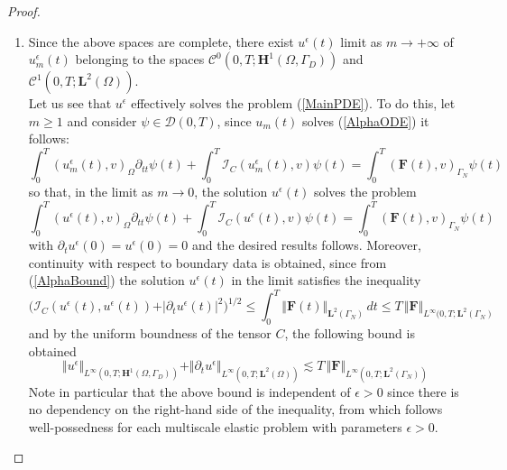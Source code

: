 \begin{proof}
\begin{enumerate}
    
    \item Since the above spaces are complete, there exist $u^{\epsilon}(t)$ limit as $m \longrightarrow +\infty$ of $u^{\epsilon}_m(t)$ belonging to the spaces $\mathcal{C}^0(0,T; \mathbf{H}^1(\Omega, \Gamma_D))$ and $\mathcal{C}^1(0,T; \mathbf{L}^2(\Omega))$.\\
    Let us see that $u^{\epsilon}$ effectively solves the problem (\ref{MainPDE}). To do this, let $m \geq 1$ and consider $\psi \in \mathcal{D}(0,T)$, since $u_m(t)$ solves (\ref{AlphaODE}) it follows:
    \begin{equation*}
        \int_0^T (u_m^{\epsilon}(t),v)_{\Omega} \partial_{tt}\psi(t) + \int_0^T \mathcal{I}_C (u_m^{\epsilon}(t),v) \psi(t)  = \int_0^T (\mathbf{F}(t),v)_{\Gamma_N} \psi(t) 
    \end{equation*}
    so that, in the limit as $m \longrightarrow 0$, the solution $u^{\epsilon}(t)$ solves the problem
    \begin{equation*}
        \int_0^T (u^{\epsilon}(t),v)_{\Omega} \partial_{tt}\psi(t) + \int_0^T \mathcal{I}_C (u^{\epsilon}(t),v) \psi(t) = \int_0^T (\mathbf{F}(t),v)_{\Gamma_N}\psi(t) 
    \end{equation*}
    with $\partial_t u^{\epsilon}(0) = u^{\epsilon}(0) = 0$ and the desired results follows. Moreover, continuity with respect to boundary data is obtained, since from (\ref{AlphaBound}) the solution $u^{\epsilon}(t)$ in the limit satisfies the inequality 
    \begin{equation*}
        \big( \mathcal{I}_C(u^{\epsilon}(t), u^{\epsilon}(t))+ \vert \partial_t u^{\epsilon}(t) \vert^2 \big)^{1/2} \leq \int_0^T \Vert \mathbf{F}(t) \Vert_{\mathbf{L}^2(\Gamma_N)} \, dt \leq T\, \Vert \mathbf{F}\Vert_{L^{\infty}(0,T;\mathbf{L}^2(\Gamma_N)}
    \end{equation*}
    and by the uniform boundness of the tensor $C$, the following bound is obtained
    \begin{equation*}
        \Vert u^{\epsilon} \Vert_{L^{\infty}(0,T;\mathbf{H}^1(\Omega, \Gamma_D))}  + \Vert \partial_t u^{\epsilon} \Vert_{L^{\infty}(0,T;\mathbf{L}^2(\Omega))} \lesssim T \, \Vert \mathbf{F}\Vert_{L^{\infty}(0,T; \mathbf{L}^2(\Gamma_N))}
    \end{equation*}
    Note in particular that the above bound is independent of $\epsilon > 0$ since there is no dependency on the right-hand side of the inequality, from which follows well-possedness for each multiscale elastic problem with parameters $\epsilon > 0$.
\end{enumerate}

\end{proof}

